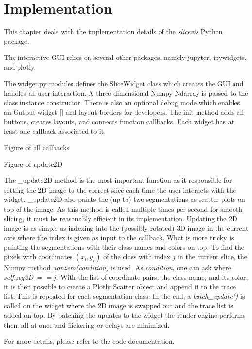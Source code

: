 \chapter{Implementation}
This chapter deals with the implementation details of the \emph{slicevis} Python package.

The interactive GUI relies on several other packages, namely jupyter, ipywidgets, and plotly.  

The widget.py modules defines the SliceWidget class which creates the GUI and handles all user interaction. A three-dimensional Numpy Ndarray is passed to the class instance constructor. There is also an optional debug mode which enables an Output widget [] and layout borders for developers. The init method adds all buttons, creates layouts, and connects function callbacks. Each widget has at least one callback associated to it.

Figure of all callbacks

Figure of update2D

The \_update2D method is the most important function as it responsible for setting the 2D image to the correct slice each time the user interacts with the widget. \_update2D also paints the (up to) two segmentations as scatter plots on top of the image. As this method is called multiple times per second for smooth slicing, it must be reasonably efficient in its implementation. Updating the 2D image is as simple as indexing into the (possibly rotated) 3D image in the current axis where the index is given as input to the callback. What is more tricky is painting the segmentations with their class names and colors on top. To find the pixels with coordinates $(x_i , y_i)$ of the class with index $j$ in the current slice, the Numpy method \emph{nonzero(condition)} is used. As \emph{condition}, one can ask where \emph{self.seg2D} $== j$. With the list of coordinate pairs, the class name, and its color, it is then possible to create a Plotly Scatter object and append it to the trace list. This is repeated for each segmentation class. In the end, a \emph{batch\_update()} is called on the widget where the 2D image is swapped out and the trace list is added on top. By batching the updates to the widget the render engine performs them all at once and flickering or delays are minimized. 


For more details, please refer to the code documentation.